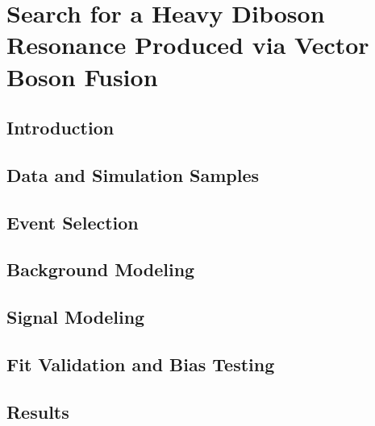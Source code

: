 
\chapter{Search for a Heavy Diboson Resonance Produced via Vector Boson Fusion}
\label{chap:search}

\section{Introduction}

\section{Data and Simulation Samples}
\label{sec:samples}

\section{Event Selection}
\label{sec:events}

\section{Background Modeling}
\label{sec:bkg}

\section{Signal Modeling}
\label{sec:sig}

\section{Fit Validation and Bias Testing}
\label{sec:bias}

\section{Results}
\label{sec:results}
